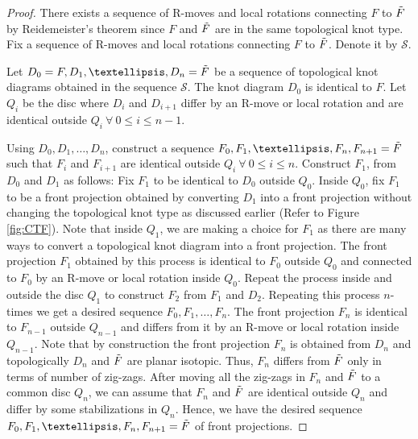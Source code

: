 \documentclass[11pt]{amsart}
\numberwithin{equation}{section}
\theoremstyle{plain}
\theoremstyle{definition}
\theoremstyle{remark} \newtheorem{remark}[equation]{Remark}
\theoremstyle{remark} \newtheorem{observation}[equation]{Observation}
\begin{document}
\begin{proof}
    There exists a sequence of R-moves and local rotations connecting $F$ to $\Tilde{F}$ by Reidemeister's theorem \cite{R} since $F$ and $\Tilde{F}$ are in the same topological knot 
    type. Fix a sequence of R-moves and local rotations connecting $F$ to $\Tilde{F}$. Denote it by $\mathcal{S}$. 

 Let $D_0=F, D_1,\ldots,D_n=\Tilde{F}$ be a sequence 
 of topological knot diagrams obtained in the sequence $\mathcal{S}$. The knot diagram $D_0$ is identical to $F$. Let $Q_i$ be the disc where $D_i$  and $D_{i+1}$ differ by an R-move or local rotation and are identical outside $Q_i\: \forall \ 0\leq i\leq n-1$. 

Using $D_0,D_1,\ldots,D_n$, construct a sequence $F_0,F_1,\ldots,F_n,F_{n+1}=\Tilde{F}$ such that $F_{i}$ and $F_{i+1}$ are identical outside $Q_{i}\: \forall \ 0\leq i \le n$. Construct $F_1$, from $D_0$ and $D_1$ as follows: Fix $F_1$ to be identical to $D_0$ outside $Q_0$. Inside $Q_0$, fix $F_1$ to be a front projection 
obtained by converting $D_1$ into a front projection without changing the topological knot type as discussed earlier (Refer to Figure \ref{fig:CTF}). Note that inside $Q_1$, we are making a 
choice for $F_1$ as there are many ways to convert a topological knot diagram into a front projection. The front projection $F_1$ obtained by this process is 
identical to $F_0$ outside $Q_0$ and connected to $F_0$ by an R-move or local rotation inside $Q_0$. Repeat the process inside and outside the disc $Q_1$ to construct $F_2$ from $F_1$ and $D_2$. Repeating this process $n$-times we get a 
desired sequence $F_0, F_1,\ldots, F_n$. The front projection $F_n$ is identical to $F_{n-1}$ outside $Q_{n-1}$ and differs from it by an R-move or local rotation inside $Q_{n-1}$. Note that by construction the front projection $F_n$ is 
obtained from $D_n$ and topologically $D_n$ and $\Tilde{F}$ are planar isotopic. Thus, $F_n$ differs from $\Tilde{F}$ only in terms of number of zig-zags. After moving all the zig-zags in $F_n$ and $\Tilde{F}$ to 
a common disc $Q_{n}$, we can assume that $F_n$ and $\Tilde{F}$ are identical outside $Q_{n}$ and differ by some stabilizations in $Q_{n}$. Hence, we have 
the desired sequence $F_0,F_1,\ldots,F_n,F_{n+1}=\Tilde{F}$ of front projections. 
   
\end{proof}
\end{document}
